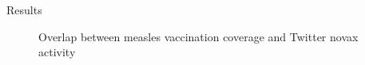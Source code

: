 \documentclass[9pt]{beamer}
\begin{document}
\begin{frame}{Results}
\begin{figure}
\begin{minipage}[c]{0.48\linewidth}
	\end{minipage}
	\caption{Overlap between measles vaccination coverage and Twitter novax activity}
	\end{figure}
	\end{frame}
	
\end{document}
